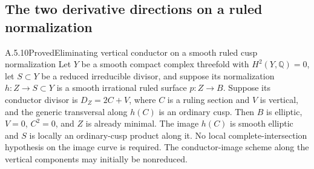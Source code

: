 \subsection{The two derivative directions on a ruled normalization}

\begin{statement}{A.5.10}{Proved}{Eliminating vertical conductor on a smooth ruled cusp normalization}
Let $Y$ be a smooth compact complex threefold with
$H^2(Y,\mathbb Q)=0$, let $S\subset Y$ be a reduced
irreducible divisor, and suppose its normalization
$h:Z\to S\subset Y$ is a smooth irrational
ruled surface $p:Z\to B$.
Suppose its conductor divisor is $D_Z=2C+V$, where
$C$ is a ruling section and $V$ is vertical, and
the generic transversal along $h(C)$ is an ordinary cusp.
Then $B$ is elliptic, $V=0$, $C^2=0$, and $Z$ is
already minimal.
The image $h(C)$ is smooth elliptic and $S$ is locally
an ordinary-cusp product along it. No local
complete-intersection hypothesis on the image curve is
required. The conductor-image scheme along the vertical
components may initially be nonreduced.
\end{statement}
